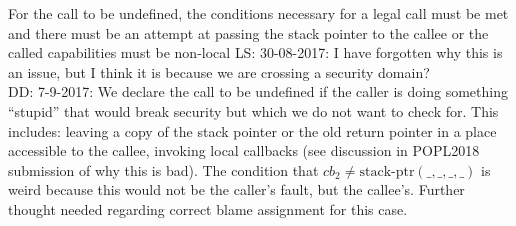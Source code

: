 \documentclass[a4paper]{article}
\newcommand\lau[1]{{\color{purple} \sf \footnotesize {LS: #1}}\\}
\newcommand\dominique[1]{{\color{purple} \sf \footnotesize {DD: #1}}\\}
\newcommand{\stkptr}[1]{\mathrm{stack\text{-}ptr}(#1)}
\newcommand{\var}[1]{\mathit{#1}}
\newcommand{\cb}{\var{cb}}
\begin{document}
For the call to be undefined, the conditions necessary for a legal call must be met and there must be an attempt at passing the stack pointer to the callee or the called capabilities must be non-local \lau{30-08-2017: I have forgotten why this is an issue, but I think it is because we are crossing a security domain?}
\dominique{7-9-2017: We declare the call to be undefined if the caller is doing something ``stupid'' that would break security but which we do not want to check for.  This includes: leaving a copy of the stack pointer or the old return pointer in a place accessible to the callee, invoking local callbacks (see discussion in POPL2018 submission of why this is bad).  The condition that $\cb_2 \neq \stkptr{\_,\_,\_,\_}$ is weird because this would not be the caller's fault, but the callee's.  Further thought needed regarding correct blame assignment for this case.}
\end{document}
